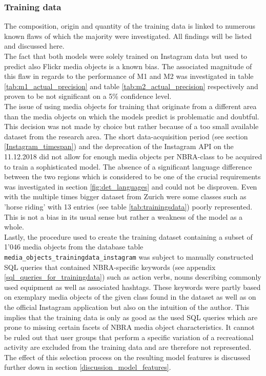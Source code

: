 \subsubsection{Training data} The composition, origin and quantity of the training data is linked to numerous known flaws of which the majority were investigated. All findings will be listed and discussed here. \\
The fact that both models were solely trained on Instagram data but used to predict also Flickr media objects is a known bias. The associated magnitude of this flaw in regards to the performance of M1 and M2 was investigated in table \ref{tab:m1_actual_precision} and table \ref{tab:m2_actual_precision} respectively and proven to be not significant on a 5\% confidence level. \\
The issue of using media objects for training that originate from a different area than the media objects on which the models predict is problematic and doubtful. This decision was not made by choice but rather because of a too small available dataset from the research area. The short data-acquisition period (see section \ref{Instagram_timespan}) and the deprecation of the Instagram API on the 11.12.2018 did not allow for enough media objects per NBRA-class to be acquired to train a sophisticated model. The absence of a significant language difference between the two regions which is considered to be one of the crucial requirements was investigated in section \ref{fig:det_languages} and could not be disproven. Even with the multiple times bigger dataset from Zurich were some classes such as 'horse riding' with 13 entries (see table \ref{tab:trainingsdata}) poorly represented. This is not a bias in its usual sense but rather a weakness of the model as a whole. \\
Lastly, the procedure used to create the training dataset containing a subset of 1'046 media objects from the database table \texttt{media\_objects\_trainingdata\_instagram} was subject to manually constructed SQL queries that contained NBRA-specific keywords (see appendix \ref{sql_queries_for_trainingdata}) such as action verbs, nouns describing commonly used equipment as well as associated hashtags. These keywords were partly based on exemplary media objects of the given class found in the dataset as well as on the official Instagram application but also on the intuition of the author. This implies that the training data is only as good as the used SQL queries which are prone to missing certain facets of NBRA media object characteristics. It cannot be ruled out that user groups that perform a specific variation of a recreational activity are excluded from the training data and are therefore not represented. The effect of this selection process on the resulting model features is discussed further down in section \ref{discussion_model_features}.

